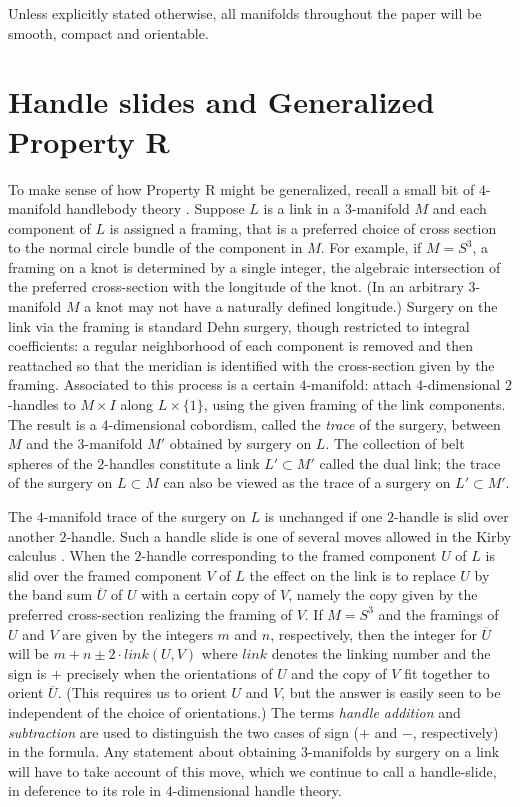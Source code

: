 \documentclass{amsart}
\begin{document}
Unless explicitly stated otherwise, all manifolds throughout the paper will be smooth, compact and orientable.

\section{Handle slides and Generalized Property R}

To make sense of how Property R might be generalized, recall a small bit of $4$-manifold handlebody theory \cite{GS}.  Suppose $L$ is a link in a $3$-manifold $M$ and each component of $L$ is assigned a framing, that is a preferred choice of cross section to the normal circle bundle of the component in $M$. For example, if $M = S^3$, a framing on a knot is determined by a single integer, the algebraic intersection of the preferred cross-section with the longitude of the knot.  (In an arbitrary $3$-manifold $M$ a knot may not have a naturally defined longitude.)  Surgery on the link via the framing is standard Dehn surgery, though restricted to integral coefficients:  a regular neighborhood of each component is removed and then reattached so that the meridian is identified with the cross-section given by the framing.  Associated to this process is a certain $4$-manifold:  attach $4$-dimensional $2$-handles to $M \times I$ along $L \times \{ 1 \}$, using the given framing of the link components.  The result is a $4$-dimensional cobordism, called the {\em trace} of the surgery, between $M$ and the $3$-manifold $M'$ obtained by surgery on $L$. The collection of belt spheres of the $2$-handles constitute a link $L' \subset M'$ called the dual link; the trace of the surgery on $L \subset M$ can also be viewed as the trace of a surgery on $L' \subset M'$.

The $4$-manifold trace of the surgery on $L$ is unchanged if one $2$-handle is slid over another $2$-handle.  Such a handle slide is one of several moves allowed in the Kirby calculus \cite{Ki1}.  When the $2$-handle corresponding to the framed component $U$ of $L$ is slid over the framed component $V$ of $L$ the effect on the link is to replace $U$ by the band sum $\overline{U}$ of $U$ with a certain copy of $V$, namely the copy given by the preferred cross-section realizing the framing of $V$. If $M = S^3$ and the framings of $U$ and $V$ are given by the integers $m$ and $n$, respectively, then the integer for $\overline{U}$ will be $m+n\pm 2\cdot link(U,V)$ where $link$ denotes the linking number and the sign is $+$ precisely when the orientations of $U$ and the copy of $V$ fit together to orient $\overline{U}$. (This requires us to orient $U$ and $V$, but the answer is easily seen to be independent of the choice of orientations.) The terms {\em handle addition} and {\em subtraction} are used to distinguish the two cases of sign ($+$ and $-$, respectively) in the formula. Any statement about obtaining $3$-manifolds by surgery on a link will have to take account of this move, which we continue to call a handle-slide, in deference to its role in $4$-dimensional handle theory.
\end{document}
